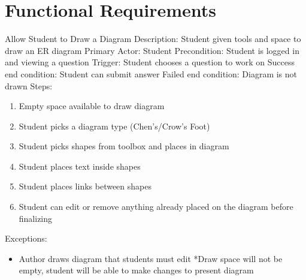 
    \chapter{Functional Requirements}
    \begin{section}{Allow Student to Draw a Diagram}
        Description: Student given tools and space to draw an ER diagram \newline
        Primary Actor: Student \newline
        Precondition: Student is logged in and viewing a            question \newline
        Trigger: Student chooses a question to work on \newline
        Success end condition: Student can submit answer            \newline
        Failed end condition: Diagram is not drawn \newline
        \newline
        Steps:
        \begin{enumerate}
            \item{Empty space available to draw diagram}
            \item{Student picks a diagram type (Chen's/Crow's Foot)}
            \item{Student picks shapes from toolbox and places in           diagram}
            \item{Student places text inside shapes}
            \item{Student places links between shapes}
            \item{Student can edit or remove anything already placed on the diagram before finalizing}
        \end{enumerate}
        Exceptions:
        \begin{itemize}
            \item{Author draws diagram that students must edit             \newline
                *Draw space will not be empty, student will be able to           make changes to present diagram}
        \end{itemize}
    \end{section}

